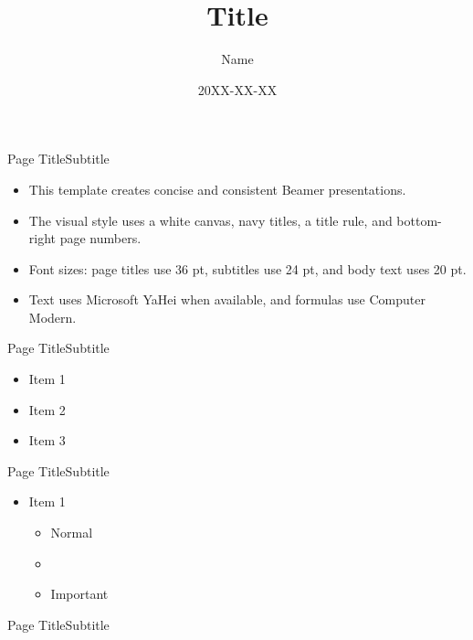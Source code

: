 \documentclass[11pt,notheorems,aspectratio=169,t]{beamer}
\title[Title]{Title}
\author{Name}
\institute{Institution}
\date{20XX-XX-XX}
\begin{document}
{
\begin{frame}
  \titlepage
\end{frame}
}
\addtocounter{framenumber}{-1}

\begin{frame}{Page Title}{Subtitle}
  \begin{itemize}
    \item This template creates concise and consistent Beamer presentations.
    \item The visual style uses a white canvas, navy titles, a title rule, and bottom-right page numbers.
    \item Font sizes: page titles use 36 pt, subtitles use 24 pt, and body text uses 20 pt.
    \item Text uses Microsoft YaHei when available, and formulas use Computer Modern.
  \end{itemize}
\end{frame}

\begin{frame}{Page Title}{Subtitle}
  \begin{itemize}
    \item Item 1
    \item Item 2
    \item Item 3
  \end{itemize}
\end{frame}

\begin{frame}{Page Title}{Subtitle}
  \begin{itemize}
    \item Item 1
      \begin{itemize}
        \item Normal
        \item {}
        \item \alert{Important}
      \end{itemize}
  \end{itemize}
\end{frame}

\begin{frame}{Page Title}{Subtitle}
\end{frame}
\end{document}
